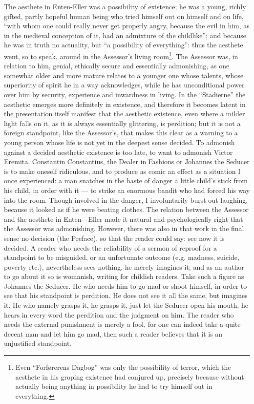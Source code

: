 \documentclass[12pt,a4paper,openany]{book}
\newcommand{\opage}[1]{\marginnote{\footnotesize\textit{[#1]}}}
\begin{document}
The aesthete in Enten-Eller was a possibility of existence; he was a young, richly
gifted, partly hopeful human being who tried himself out on himself and on life,
``with whom one could really never get properly angry, because the evil in him, as in
the medieval conception of it, had an admixture of the childlike''; and because he was
in truth no actuality, but ``a possibility of everything'': thus the aesthete went, so
to speak, around in the Assessor's living room\footnote[1]{Even ``Forførerens Dagbog''
was only the possibility of terror, which the aesthete in his groping existence had
conjured up, precisely because without actually being anything in possibility he had to
try himself out in everything.}. The
\setcounter{footnote}{0}%
\opage{195}Assessor was, in relation to him, genial, ethically secure and essentially
admonishing, as one somewhat older and more mature relates to a younger one whose
talents, whose superiority of spirit he in a way acknowledges, while he has
unconditional power over him by security, experience and inwardness in living. In the
``Stadierne'' the aesthetic emerges more definitely in existence, and therefore it
becomes latent in the presentation itself manifest that the aesthetic existence, even
where a milder light falls on it, as it is always essentially glittering, is
perdition; but it is not a foreign standpoint, like the Assessor's, that makes this
clear as a warning to a young person whose life is not yet in the deepest sense
decided. To admonish against a decided aesthetic existence is too late, to want to
admonish Victor Eremita, Constantin Constantius, the Dealer in Fashions or Johannes
the Seducer is to make oneself ridiculous, and to produce as comic an effect as a
situation I once experienced: a man snatches in the haste of danger a little child's
stick from his child, in order with it --- to strike an enormous bandit who had forced
his way into the room. Though involved in the danger, I involuntarily burst out
laughing, because it looked as if he were beating clothes. The relation between the
Assessor and the aesthete in Enten---Eller made it natural and psychologically right
that the Assessor was admonishing. However, there was also in that work in the final
sense no decision (the Preface), so that the reader could say: see now it is decided.
A reader who needs the reliability of a sermon of reproof for a standpoint to be
misguided, or an unfortunate outcome (e.g. madness, suicide, poverty etc.), nevertheless
sees nothing, he merely imagines it; and as an author to go about it so is womanish,
writing for childish readers. Take such a figure as Johannes the Seducer. He who needs
him to go mad or shoot himself, in order to see that his standpoint is perdition. He
does not see it all the same, but imagines it. He who namely grasps it, he grasps it,
just let the Seducer open his
\setcounter{footnote}{0}%
\opage{196}mouth, he hears in every word the perdition and the judgment on him. The reader who
needs the external punishment is merely a fool, for one can indeed take a quite decent
man and let him go mad, then such a reader believes that it is an unjustified
standpoint.
\end{document}
